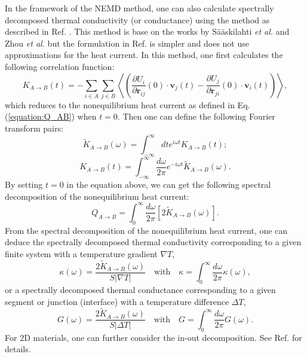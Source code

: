 \documentclass[12pt,a4paper]{report}
\newcommand{\vect}[1]{\boldsymbol{#1}}
\begin{document}
In the framework of the NEMD method, one can also calculate spectrally decomposed thermal conductivity (or conductance) using the method as described in Ref. \cite{fan2017prb}. This method is base on the works by S\"a\"askilahti \textit{et al.} \cite{saaskilahti2014prb,saaskilahti2015prb} and Zhou \textit{et al.} \cite{zhou2015prb_b} but the formulation in Ref. \cite{fan2017prb} is simpler and does not use approximations for the heat current. In this method, one first calculates the following correlation function:
\begin{equation}
\label{equation:K_time}
\boxed{
K_{A \rightarrow B}(t) = - \sum_{i \in A} \sum_{j \in B}
\left\langle
\left(\frac{\partial U_i}{\partial \vect{r}_{ij}} (0)\cdot \vect{v}_j(t)
-\frac{\partial U_j}{\partial \vect{r}_{ji}} (0) \cdot \vect{v}_i (t) \right)
\right\rangle
},
\end{equation}
which reduces to the nonequilibrium heat current as defined in Eq. (\ref{equation:Q_AB}) when $t=0$. Then one can define the following Fourier transform pairs:
\begin{equation}
\label{equation:K_omega_from_time}
\boxed{
\tilde{K}_{A \rightarrow B}(\omega)
= \int_{-\infty}^{\infty} dt e^{i\omega t}
K_{A \rightarrow B}(t)
};
\end{equation}
\begin{equation}
\label{equation:K_time_from_omega}
\boxed{
K_{A \rightarrow B}(t)
= \int_{-\infty}^{\infty} \frac{d\omega}{2\pi} e^{-i\omega t}
\tilde{K}_{A \rightarrow B}(\omega)
}.
\end{equation}
By setting $t=0$ in the equation above, we can get the following spectral decomposition of the nonequilibrium heat current:
\begin{equation}
\boxed{
Q_{A \rightarrow B}
= \int_{0}^{\infty} \frac{d\omega}{2\pi}
\left[2\tilde{K}_{A \rightarrow B}(\omega)\right]
}.
\end{equation}
From the spectral decomposition of the nonequilibrium heat current, one can deduce the spectrally decomposed thermal conductivity corresponding to a given finite system with a temperature gradient $\nabla T$,
\begin{equation}
\boxed{
\kappa(\omega)
= \frac{2\tilde{K}_{A \rightarrow B}(\omega)}{S|\nabla T|}
\quad
\text{with}
\quad
\kappa = \int_{0}^{\infty} \frac{d\omega}{2\pi} \kappa(\omega)
},
\end{equation}
or a spectrally decomposed thermal conductance corresponding to a given segment or junction (interface) with a temperature difference $\Delta T$,
\begin{equation}
\boxed{
G(\omega)
= \frac{2\tilde{K}_{A \rightarrow B}(\omega)}{S|\Delta T|}
\quad
\text{with}
\quad
G = \int_{0}^{\infty} \frac{d\omega}{2\pi} G(\omega)
}.
\end{equation}
For 2D materials, one can further consider the in-out decomposition. See Ref. \cite{fan2017prb} for details.
\end{document}
